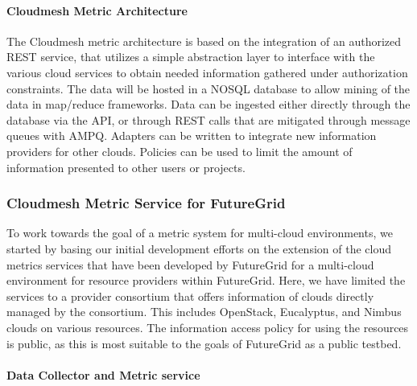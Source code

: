 \documentclass{tex/sig-alternate-2013}
\newcommand{\todo}[1]{{\color{red}{#1}}}
\begin{document}
{\paragraph{Cloudmesh Metric Architecture}

The Cloudmesh metric architecture is based on the integration of an authorized REST service, that utilizes a simple abstraction layer to interface with the various cloud services to obtain needed information gathered under authorization constraints. The data will be hosted in a NOSQL database to allow mining of the data in map/reduce frameworks. Data can be ingested either directly through the database via the API, or through REST calls that are mitigated through message queues with AMPQ. Adapters can be written to integrate new information providers for other clouds. Policies can be used to limit the amount of information presented to other users or projects.

\subsubsection{Cloudmesh Metric Service for FutureGrid}

To work towards the goal of a metric system for multi-cloud environments, we started by basing our initial development efforts on the extension of the cloud metrics services that have been developed by FutureGrid for a multi-cloud environment for resource providers within FutureGrid. Here, we have limited the services to a provider consortium that offers information of clouds directly managed by the consortium. This includes OpenStack, Eucalyptus, and Nimbus clouds on various resources. The information access policy for using the resources is public, as this is most suitable to the goals of FutureGrid as a public testbed.

\paragraph{Data Collector and Metric service}

\todo{READ}


}
\end{document}
